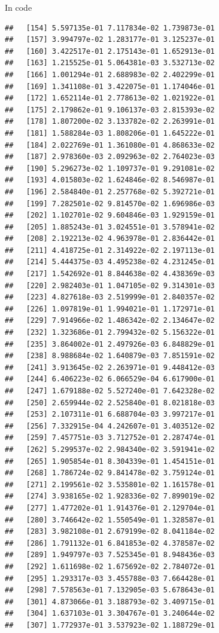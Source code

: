 \documentclass[ignorenonframetext,]{beamer}
\begin{document}
\begin{frame}[fragile]{In code}
\begin{verbatim}
##   [154] 5.597135e-01 7.117834e-02 1.739873e-01
##   [157] 3.994797e-02 1.283177e-01 3.125237e-01
##   [160] 3.422517e-01 2.175143e-01 1.652913e-01
##   [163] 1.215525e-01 5.064381e-03 3.532713e-02
##   [166] 1.001294e-01 2.688983e-02 2.402299e-01
##   [169] 1.341108e-01 3.422075e-01 1.174046e-01
##   [172] 1.652114e-01 2.778613e-02 1.021922e-01
##   [175] 2.179862e-01 9.106137e-03 2.815393e-02
##   [178] 1.807200e-02 3.133782e-02 2.263991e-01
##   [181] 1.588284e-03 1.808206e-01 1.645222e-01
##   [184] 2.022769e-01 1.361080e-01 4.868633e-02
##   [187] 2.978360e-03 2.092963e-02 2.764023e-03
##   [190] 5.296273e-02 1.109737e-01 9.291081e-02
##   [193] 4.015803e-02 1.624846e-02 8.546987e-01
##   [196] 2.584840e-01 2.257768e-02 5.392721e-01
##   [199] 7.282501e-02 9.814570e-02 1.696986e-03
##   [202] 1.102701e-02 9.604846e-03 1.929159e-01
##   [205] 1.885243e-01 3.024551e-01 3.578941e-02
##   [208] 2.192213e-02 4.963978e-01 2.836442e-01
##   [211] 4.418725e-01 2.314922e-02 2.197113e-01
##   [214] 5.444375e-03 4.495238e-02 4.231245e-01
##   [217] 1.542692e-01 8.844638e-02 4.438369e-03
##   [220] 2.982403e-01 1.047105e-02 9.314301e-03
##   [223] 4.827618e-03 2.519999e-01 2.840357e-02
##   [226] 1.097819e-01 1.994021e-01 1.172971e-01
##   [229] 7.914966e-02 1.486342e-02 2.134647e-02
##   [232] 1.323686e-01 2.799432e-02 5.156322e-01
##   [235] 3.864002e-01 2.497926e-03 6.848829e-01
##   [238] 8.988684e-02 1.640879e-03 7.851591e-02
##   [241] 3.913645e-02 2.263971e-01 9.448412e-03
##   [244] 6.406223e-02 6.066529e-04 6.617900e-01
##   [247] 1.679188e-02 5.527240e-01 7.642328e-02
##   [250] 2.659944e-02 2.525840e-01 8.021818e-03
##   [253] 2.107311e-01 6.688704e-03 3.997217e-01
##   [256] 7.332915e-04 4.242607e-01 3.403512e-02
##   [259] 7.457751e-03 3.712752e-01 2.287474e-01
##   [262] 5.299537e-02 2.984340e-02 3.591941e-02
##   [265] 1.905854e-01 8.304339e-01 1.454151e-01
##   [268] 1.786724e-02 9.841478e-02 3.759124e-01
##   [271] 2.199561e-02 3.535801e-02 1.161578e-01
##   [274] 3.938165e-02 1.928336e-02 7.899019e-02
##   [277] 1.477202e-01 1.914376e-01 2.129704e-01
##   [280] 3.746642e-02 1.550549e-01 1.328587e-01
##   [283] 3.982108e-01 2.679199e-02 8.041184e-02
##   [286] 1.791132e-01 6.841853e-02 4.378587e-02
##   [289] 1.949797e-03 7.525345e-01 8.948436e-03
##   [292] 1.611698e-02 1.675692e-02 2.784072e-01
##   [295] 1.293317e-03 3.455788e-03 7.664428e-01
##   [298] 7.578563e-01 7.132905e-03 5.678643e-01
##   [301] 4.873066e-01 3.188793e-02 3.409715e-01
##   [304] 1.637103e-01 3.304767e-01 3.240644e-02
##   [307] 1.772937e-01 3.537923e-02 1.188729e-01

\end{verbatim}
\end{frame}
\end{document}
